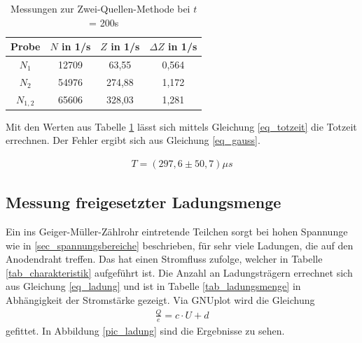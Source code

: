 \begin{table}[H]
 \begin{tabular}{c|c|c|c}
Probe & $N$ in 1/s & $Z$ in 1/s & $\Delta Z$ in 1/s \\
\hline
$N_1$	& 12709 & 63,55 & 0,564\\
$N_2$ & 54976 & 274,88 & 1,172\\
$N_{1,2}$ & 65606 & 328,03 & 1,281
  
 \end{tabular}
\caption{Messungen zur Zwei-Quellen-Methode bei $t$ = 200s}
\label{tab_2quellen}
\end{table}

Mit den Werten aus Tabelle \ref{tab_2quellen} lässt sich mittels Gleichung \eqref{eq_totzeit} die Totzeit errechnen. Der Fehler ergibt
sich aus Gleichung \eqref{eq_gauss}.

\begin{align}
 T = (297,6 \pm 50,7) \mu s
\end{align}

\subsection{Messung freigesetzter Ladungsmenge}
Ein ins Geiger-Müller-Zählrohr eintretende Teilchen sorgt bei hohen Spannunge wie in \ref{sec_spannungsbereiche} beschrieben, für sehr
viele Ladungen, die auf den Anodendraht treffen. Das hat einen Stromfluss zufolge, welcher in Tabelle \ref{tab_charakteristik}
aufgeführt ist. Die Anzahl an Ladungsträgern errechnet sich aus Gleichung \eqref{eq_ladung} und ist in Tabelle \ref{tab_ladungsmenge}
in Abhängigkeit der Stromstärke gezeigt. Via GNUplot wird die Gleichung
\begin{align}
 \frac{Q}{e} = c\cdot U + d
\end{align}
gefittet. In Abbildung \ref{pic_ladung} sind die Ergebnisse zu sehen.

